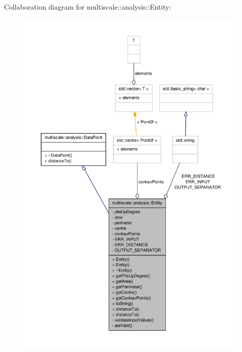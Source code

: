 \-Collaboration diagram for multiscale\-:\-:analysis\-:\-:\-Entity\-:
\nopagebreak
\begin{figure}[H]
\begin{center}
\leavevmode
\includegraphics[width=350pt]{classmultiscale_1_1analysis_1_1Entity__coll__graph}
\end{center}
\end{figure}
